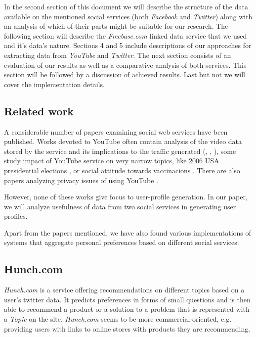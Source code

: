 In the second section of this document we will describe the structure of the data available on the mentioned social services (both \textit{Facebook} and \textit{Twitter}) along with an analysis of which of their parts might be suitable for our research. The following section will describe the \textit{Freebase.com} linked data service that we used and it's data's nature. Sections 4 and 5 include descriptions of our approaches for extracting data from \textit{YouTube} and \textit{Twitter}. The next section consists of an evaluation of our results as well as a comparative analysis of both services. This section will be followed by a discussion of achieved results. Last but not we will cover the implementation details.

\subsection{Related work}

A considerable number of papers examining social web services have been
published. Works devoted to YouTube often contain analysis of the video data
stored by the service and its implications to the traffic generated
(\cite{i-tube-you-tube}, \cite{views-from-the-edge},
\cite{statistics-and-social-network}), some study impact of YouTube service on
very narrow topics, like 2006 USA presidential elections
\cite{voters-myspace-youtube}, or social attitude towards vaccinacions
\cite{keelan}. There are also papers analyzing privacy issues of using YouTube
\cite{publicly-private}.

However, none of these works give focus to user-profile generation. In our
paper, we will analyze usefulness of data from two social services in generating
user profiles.

Apart from the papers mentioned, we have also found various implementations of systems that aggregate personal preferences based on different
social services:

\subsection{Hunch.com}
\textit{Hunch.com} is a service offering recommendations on different topics based on a user's twitter data. It predicts preferences in forms of small questions and is then able to recommend a product or a solution to a problem that is represented with a \textit{Topic} on the site. \textit{Hunch.com} seems to be more commercial-oriented, e.g. providing users with links to online stores with products they are recommending.

